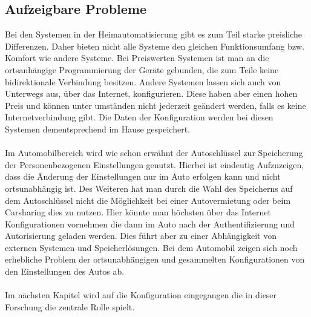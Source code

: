 \subsection{Aufzeigbare Probleme}
Bei den Systemen in der Heimautomatisierung gibt es zum Teil starke preisliche Differenzen. Daher bieten nicht alle Systeme den gleichen Funktionsumfang bzw. Komfort wie andere Systeme. 
Bei Preiswerten Systemen ist man an die ortsanhängige Programmierung der Geräte gebunden, die zum Teile keine bidirektionale Verbindung besitzen. Andere Systemen lassen sich auch von Unterwegs aus, über das Internet, konfigurieren. Diese haben aber einen hohen Preis und können unter umständen nicht jederzeit geändert werden, falls es keine Internetverbindung gibt. Die Daten der Konfiguration werden bei diesen Systemen dementsprechend im Hause gespeichert. 
\\\\
Im Automobilbereich wird wie schon erwähnt der Autoschlüssel zur Speicherung der Personenbezogenen Einstellungen genutzt. Hierbei ist eindeutig Aufzuzeigen, dass die Änderung der Einstellungen nur im Auto erfolgen kann und nicht ortsunabhängig ist. Des Weiteren hat man durch die Wahl des Speicherns auf dem Autoschlüssel nicht die Möglichkeit bei einer Autovermietung oder beim Carsharing dies zu nutzen. Hier könnte man höchsten über das Internet Konfigurationen vornehmen die dann im Auto nach der Authentifizierung und Autorisierung geladen werden.
Dies führt aber zu einer Abhängigkeit von externen Systemen und Speicherlösungen. Bei dem Automobil zeigen sich noch erhebliche Problem der ortsunabhängigen und gesammelten Konfigurationen von den Einstellungen des Autos ab. 
\\\\
Im nächsten Kapitel wird auf die Konfiguration eingegangen die in dieser Forschung die zentrale Rolle spielt.


